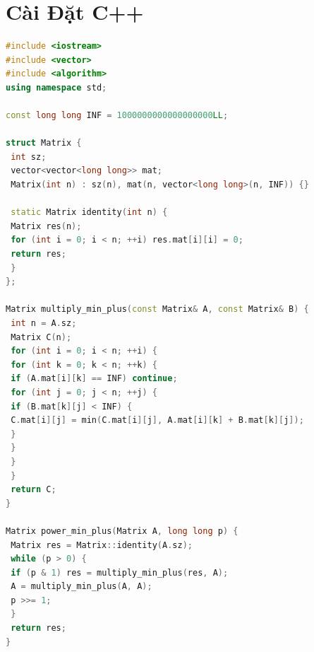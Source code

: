 \documentclass[11pt, letterpaper]{report}
\begin{document}
\section{Cài Đặt C++}
\begin{lstlisting}[language=C++, caption={C++ Min-Plus Matrix Exponentiation Engine}]
#include <iostream>
#include <vector>
#include <algorithm>
using namespace std;

const long long INF = 1000000000000000000LL;

struct Matrix {
 int sz;
 vector<vector<long long>> mat;
 Matrix(int n) : sz(n), mat(n, vector<long long>(n, INF)) {}
 
 static Matrix identity(int n) {
 Matrix res(n);
 for (int i = 0; i < n; ++i) res.mat[i][i] = 0;
 return res;
 }
};

Matrix multiply_min_plus(const Matrix& A, const Matrix& B) {
 int n = A.sz;
 Matrix C(n);
 for (int i = 0; i < n; ++i) {
 for (int k = 0; k < n; ++k) {
 if (A.mat[i][k] == INF) continue;
 for (int j = 0; j < n; ++j) {
 if (B.mat[k][j] < INF) {
 C.mat[i][j] = min(C.mat[i][j], A.mat[i][k] + B.mat[k][j]);
 }
 }
 }
 }
 return C;
}

Matrix power_min_plus(Matrix A, long long p) {
 Matrix res = Matrix::identity(A.sz);
 while (p > 0) {
 if (p & 1) res = multiply_min_plus(res, A);
 A = multiply_min_plus(A, A);
 p >>= 1;
 }
 return res;
}
\end{lstlisting}
\end{document}
